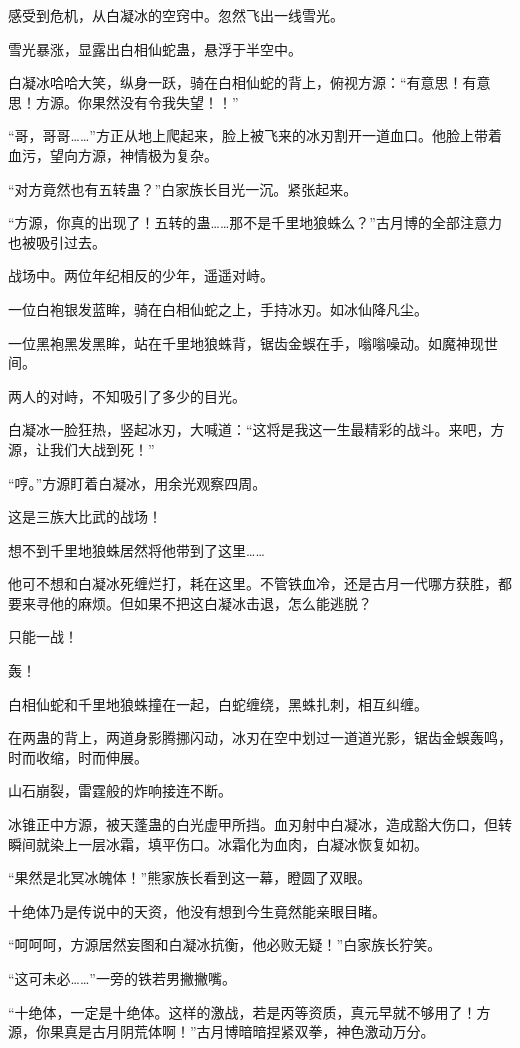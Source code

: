 \begin{this_body}
感受到危机，从白凝冰的空窍中。忽然飞出一线雪光。

雪光暴涨，显露出白相仙蛇蛊，悬浮于半空中。

白凝冰哈哈大笑，纵身一跃，骑在白相仙蛇的背上，俯视方源：“有意思！有意思！方源。你果然没有令我失望！！”

“哥，哥哥……”方正从地上爬起来，脸上被飞来的冰刃割开一道血口。他脸上带着血污，望向方源，神情极为复杂。

“对方竟然也有五转蛊？”白家族长目光一沉。紧张起来。

“方源，你真的出现了！五转的蛊……那不是千里地狼蛛么？”古月博的全部注意力也被吸引过去。

战场中。两位年纪相反的少年，遥遥对峙。

一位白袍银发蓝眸，骑在白相仙蛇之上，手持冰刃。如冰仙降凡尘。

一位黑袍黑发黑眸，站在千里地狼蛛背，锯齿金蜈在手，嗡嗡噪动。如魔神现世间。

两人的对峙，不知吸引了多少的目光。

白凝冰一脸狂热，竖起冰刃，大喊道：“这将是我这一生最精彩的战斗。来吧，方源，让我们大战到死！”

“哼。”方源盯着白凝冰，用余光观察四周。

这是三族大比武的战场！

想不到千里地狼蛛居然将他带到了这里……

他可不想和白凝冰死缠烂打，耗在这里。不管铁血冷，还是古月一代哪方获胜，都要来寻他的麻烦。但如果不把这白凝冰击退，怎么能逃脱？

只能一战！

轰！

白相仙蛇和千里地狼蛛撞在一起，白蛇缠绕，黑蛛扎刺，相互纠缠。

在两蛊的背上，两道身影腾挪闪动，冰刃在空中划过一道道光影，锯齿金蜈轰鸣，时而收缩，时而伸展。

山石崩裂，雷霆般的炸响接连不断。

冰锥正中方源，被天蓬蛊的白光虚甲所挡。血刃射中白凝冰，造成豁大伤口，但转瞬间就染上一层冰霜，填平伤口。冰霜化为血肉，白凝冰恢复如初。

“果然是北冥冰魄体！”熊家族长看到这一幕，瞪圆了双眼。

十绝体乃是传说中的天资，他没有想到今生竟然能亲眼目睹。

“呵呵呵，方源居然妄图和白凝冰抗衡，他必败无疑！”白家族长狞笑。

“这可未必……”一旁的铁若男撇撇嘴。

“十绝体，一定是十绝体。这样的激战，若是丙等资质，真元早就不够用了！方源，你果真是古月阴荒体啊！”古月博暗暗捏紧双拳，神色激动万分。


\end{this_body}
